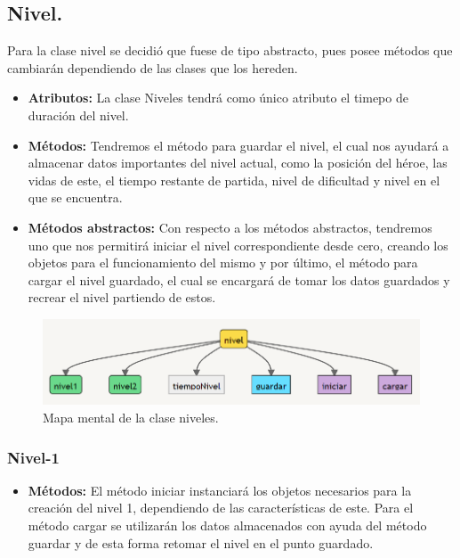 \documentclass{article}
\begin{document}
\subsection{Nivel.}\label{niveles}
Para la clase nivel se decidió que fuese de tipo abstracto, pues posee métodos que cambiarán dependiendo de las clases que los hereden.
\begin{itemize}
  \item \textbf{Atributos:} La clase Niveles tendrá como único atributo el timepo de duración del nivel.
  
  \item \textbf{Métodos:} Tendremos el método para guardar el nivel, el cual nos ayudará a almacenar datos importantes del nivel actual, como la posición del héroe, las vidas de este, el tiempo restante de partida, nivel de dificultad y nivel en el que se encuentra.
  
  \item \textbf{Métodos abstractos:}  Con respecto a los métodos abstractos, tendremos uno que nos permitirá iniciar el nivel correspondiente desde cero, creando los objetos para el funcionamiento del mismo y por último, el método para cargar el nivel guardado, el cual se encargará de tomar los datos guardados y recrear el nivel partiendo de estos. 
  
\end{itemize}

\begin{figure}[h]
\includegraphics[scale=0.8]{Images/niveles.png}
\centering
\caption{Mapa mental de la clase niveles.}
\label{fig:func1}
\end{figure}

    \subsubsection{Nivel-1}
    \begin{itemize}
        \item \textbf{Métodos:} El método iniciar instanciará los objetos necesarios para la creación del nivel 1, dependiendo de las características de este. Para el método cargar se utilizarán los datos almacenados con ayuda del método guardar y de esta forma retomar el nivel en el punto guardado.
    \end{itemize}
    
\end{document}
